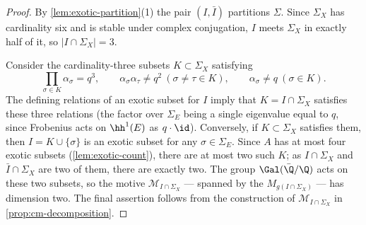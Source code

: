 \begin{proof}
  By \cref{lem:exotic-partition}(1) the pair \((I, \bar I)\) partitions
  \(\Sigma\). Since \(\Sigma_X\) has cardinality six and is stable under complex
  conjugation, \(I\) meets \(\Sigma_X\) in exactly half of it, so
  \(|I \cap \Sigma_X| = 3\).

  Consider the cardinality-three subsets \(K \subset \Sigma_X\) satisfying
  \[\prod_{\sigma \in K} \alpha_\sigma = q^3, \qquad
    \alpha_\sigma \alpha_\tau \neq q^2 \ (\sigma \neq \tau \in K), \qquad
    \alpha_\sigma \neq q \ (\sigma \in K).\]
  The defining relations of an exotic subset for \(I\) imply that
  \(K = I \cap \Sigma_X\) satisfies these three relations (the factor over
  \(\Sigma_E\) being a single eigenvalue equal to \(q\), since Frobenius acts on
  \(\hh^1(E)\) as \(q\cdot\id\)). Conversely, if \(K \subset \Sigma_X\) satisfies
  them, then \(I = K \cup \{\sigma\}\) is an exotic subset for any
  \(\sigma \in \Sigma_E\). Since \(A\) has at most four exotic subsets
  (\cref{lem:exotic-count}), there are at most two such \(K\); as
  \(I \cap \Sigma_X\) and \(\bar I \cap \Sigma_X\) are two of them, there are
  exactly two. The group \(\Gal(\bar\Q/\Q)\) acts on these two subsets, so the
  motive \(\mathcal{M}_{I \cap \Sigma_X}\) — spanned by the \(M_{g(I \cap
  \Sigma_X)}\) — has dimension two. The final assertion follows from the
  construction of \(\mathcal{M}_{I \cap \Sigma_X}\) in
  \cref{prop:cm-decomposition}.
\end{proof}

